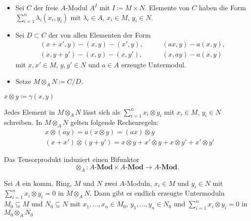 \documentclass{cheat-sheet}
\newcommand{\Mod}{\mathbf{Mod}} %
\newcommand{\LMod}[1]{{#1}\text{-}\Mod} %
\begin{document}
\begin{konstr}
  \begin{itemize}
    \item Sei $C$ der freie $A$-Modul $A^I$ mit $I \coloneqq M \times N$.
    Elemente von $C$ haben die Form $\sum_{i=1}^n \lambda_i (x_i, y_i)$ mit $\lambda_i \in A$, $x_i \in M$, $y_i \in N$.
    \item Sei $D \subset C$ der von allen Elementen der Form
    \begin{align*}
      (x + x', y) - (x, y) - (x', y), \qquad
      & (ax, y) - a (x, y), \\
      (x, y + y') - (x, y) - (x, y'), \qquad
      & (x, ay) - a (x, y)
    \end{align*}
    mit $x, x' \in M$, $y, y' \in N$ und $a \in A$ erzeugte Untermodul.
    \item Setze $M \otimes_A N \coloneqq C/D$.
  \end{itemize}
\end{konstr}

\begin{nota}
  $x \otimes y \coloneqq \gamma(x, y)$
\end{nota}

\begin{bem}
  Jedes Element in $M \otimes_A N$ lässt sich als $\sum_{i=1}^n x_i \otimes y_i$ mit $x_i \in M$, $y_i \in N$ schreiben.
  In $M \otimes_A N$ gelten folgende Rechenregeln:
  \begin{align*}
    & x \otimes (ay) = a (x \otimes y) = (ax) \otimes y \\
    & (x + x') \otimes (y + y') = x \otimes y + x' \otimes y + x \otimes y' + x' \otimes y'
  \end{align*}
\end{bem}

\begin{lem}
  Das Tensorprodukt induziert einen Bifunktor
  \[
    \otimes_A : \LMod{A} \times \LMod{A} \to \LMod{A}.
  \]
\end{lem}

\begin{lem}
  Sei $A$ ein komm. Ring, $M$ und $N$ zwei $A$-Moduln, $x_i \in M$ und $y_i \in N$ mit $\sum_{i=1}^n x_i \otimes y_i = 0$ in $M \otimes_A N$.
  Dann gibt es endlich erzeugte Untermoduln $M_0 \subseteq M$ und $N_0 \subseteq N$ mit $x_1, \ldots, x_n \in M_0$, $y_1, \ldots, y_n \in N_0$ und $\sum_{i=1}^n x_i \otimes y_i = 0$ in $M_0 \otimes_A N_0$
\end{lem}
\end{document}
